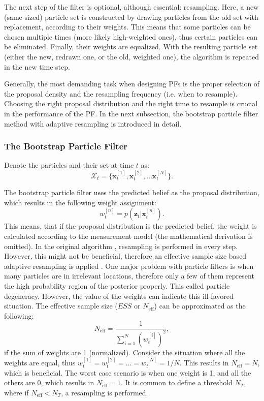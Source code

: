 The next step of the filter is optional, although essential: resampling. Here, a new (same sized) particle set is constructed by drawing particles from the old set with replacement, according to their weights. This means that some  particles can be chosen multiple times (more likely high-weighted ones), thus certain particles can be eliminated. Finally, their weights are equalized. With the resulting particle set (either the new, redrawn one, or the old, weighted one), the algorithm is repeated in the new time step.

Generally, the most demanding task when designing PFs is the proper selection of the proposal density and the resampling frequency (i.e. when to resample). Choosing the right proposal distribution and the right time to resample is crucial in the performance of the PF. In the next subsection, the bootstrap particle filter method with adaptive resampling is introduced in detail.
\subsubsection{The Bootstrap Particle Filter}

Denote the particles and their set at time $t$  as:
\begin{equation}\label{key}
    \mathcal{X}_t = \{\mathbf{x}_t^{[1]},\mathbf{x}_t^{[2]}, \dots \mathbf{x}_t^{[N]}\}.
\end{equation}

The bootstrap particle filter uses the predicted belief as the proposal distribution, which results in the following weight assignment:
\begin{equation}\label{key}
    w_t^{[n]} = p(\mathbf{z}_t|\mathbf{x}_t^{[n]}).
\end{equation}
This means, that  if the proposal distribution is the predicted belief, the weight is calculated according to the measurement model (the mathematical derivation is omitted). In the original algorithm \cite{bpf}, resampling is performed in every step. However, this might not be beneficial, therefore an effective sample size based adaptive resampling is applied \cite{ess}. One major problem with particle filters is when many particles are in irrelevant locations, therefore only a few of them represent the high probability region of the posterior properly. This called particle degeneracy. However, the value of the weights can indicate this ill-favored situation. The effective sample size ($ESS$ or $N_{\mathrm{eff}}$) can be approximated as the following:
\begin{equation}\label{eq:neff}
    N_{\mathrm{eff}} = \frac{1}{\sum_{i = 1}^{N}(w_t^{[i]})^2},
\end{equation}
if the sum of weights are 1 (normalized). Consider the situation where all the weights are equal, thus $w_t^{[1]} = w_t^{[2]} = \dots = w_t^{[N]} = 1/N$. This results in $N_{\mathrm{eff}} = N$, which is beneficial. The worst case scenario is when one weight is 1, and all the others are 0, which results in $N_{\mathrm{eff}} = 1$. It is common to define a threshold $N_{T}$, where if $N_{\mathrm{eff}} < N_T$, a resampling is performed.

